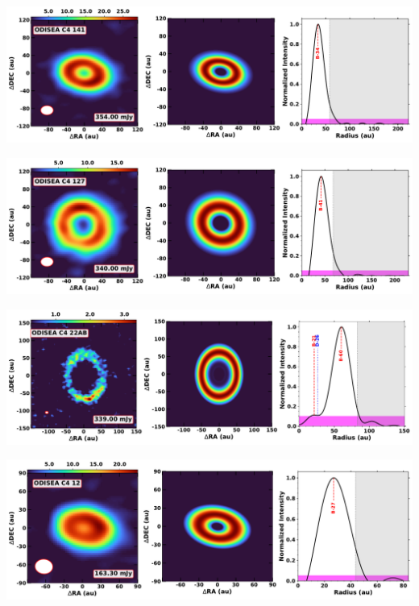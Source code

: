 \noindent
\begin{minipage}{.49\textwidth}
	 \centering
	 	 \hrulesep
	 	 \includegraphics[width=1\linewidth]{pdf/5+II/090_odisea_c4_141_cutout.pdf}
\end{minipage}%
\vrulesep
\begin{minipage}{.49\textwidth}
	 \centering
	 	 \hrulesep
	 	 \includegraphics[width=1\linewidth]{pdf/5+II/089_odisea_c4_127_cutout.pdf}
\end{minipage}%
\vspace{0pt}
\begin{minipage}{.49\textwidth}
	 \centering
	 	 \hrulesep
	 	 \includegraphics[width=1\linewidth]{pdf/5+II/088_odisea_c4_22ab_cutout.pdf}
\end{minipage}%
\vrulesep
\begin{minipage}{.49\textwidth}
	 \centering
	 	 \hrulesep
	 	 \includegraphics[width=1\linewidth]{pdf/5+II/076_odisea_c4_12_cutout.pdf}
\end{minipage}%
\vspace{0.8cm}